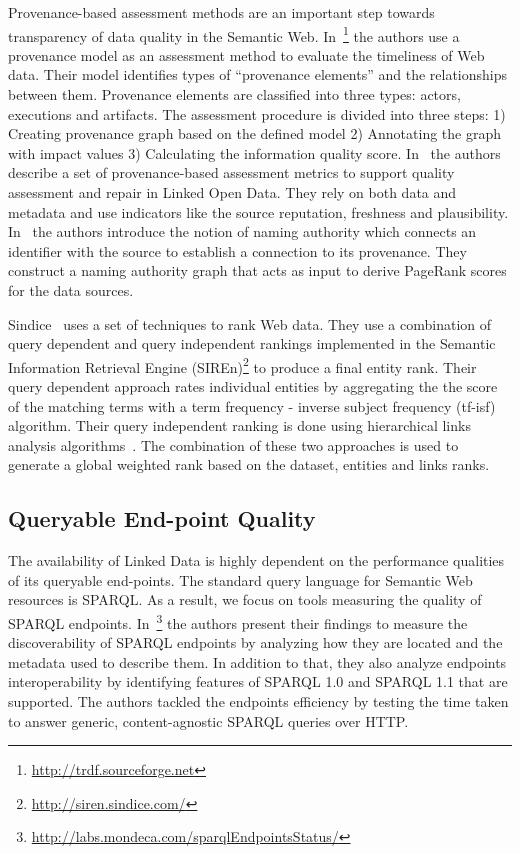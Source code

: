 \documentclass[onecolumn, crcready]{../../Util/LaTEX/iosart2c}
\begin{document}

Provenance-based assessment methods are an important step towards transparency of data quality in the Semantic Web. In~\cite{Hartig:ISWC:09}\footnote{\url{http://trdf.sourceforge.net}} the authors use a provenance model as an assessment method to evaluate the timeliness of Web data. Their model identifies types of ``provenance elements'' and the relationships between them. Provenance elements are classified into three types: actors, executions and artifacts. The assessment procedure is divided into three steps: 1) Creating provenance graph based on the defined model 2) Annotating the graph with impact values 3) Calculating the information quality score. In~\cite{Flouris:EvoDyn:12} the authors describe a set of provenance-based assessment metrics to support quality assessment and repair in Linked Open Data. They rely on both data and metadata and use indicators like the source reputation, freshness and plausibility. In~\cite{Harth:ISWC:09} the authors introduce the notion of naming authority which connects an identifier with the source to establish a connection to its provenance. They construct a naming authority graph that acts as input to derive PageRank scores for the data sources.


Sindice~\cite{Tummarello:ISWC:07} uses a set of techniques to rank Web data. They use a combination of query dependent and query independent rankings implemented in the Semantic Information Retrieval Engine (SIREn)\footnote{\url{http://siren.sindice.com/}} to produce a final entity rank. Their query dependent approach rates individual entities by aggregating the the score of the matching terms with a term frequency - inverse subject frequency (tf-isf) algorithm. Their query independent ranking is done using hierarchical links analysis algorithms~\cite{Delbru:ESWC:10}. The combination of these two approaches is used to generate a global weighted rank based on the dataset, entities and links ranks.

\subsection{Queryable End-point Quality}
The availability of Linked Data is highly dependent on the performance qualities of its queryable end-points. The standard query language for Semantic Web resources is SPARQL. As a result, we focus on tools measuring the quality of SPARQL endpoints. In~\cite{BuilAranda:ISWC:13}\footnote{\url{http://labs.mondeca.com/sparqlEndpointsStatus/}} the authors present their findings to measure the discoverability of SPARQL endpoints by analyzing how they are located and the metadata used to describe them. In addition to that, they also analyze endpoints interoperability by identifying features of SPARQL 1.0 and SPARQL 1.1 that are supported. The authors tackled the endpoints efficiency by testing the time taken to answer generic, content-agnostic SPARQL queries over HTTP.
\end{document}

